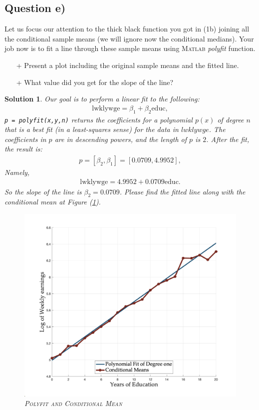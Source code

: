 \documentclass[9pt]{tufte-handout}
\newcommand{\inline}[1]{$ #1 $}
\newcommand{\problem}[1]{{\color{gray} #1}}
\newcommand{\solution}[1]{{\color{NavyBlue} #1}}
\newcommand{\qedblack}{\hfill \blacksquare}
\newtheorem*{Solution}{Solution}
\begin{document}
\subsection{Question e)}
\problem{Let us focus our attention to the thick black function you got in (1b) joining all the conditional sample means (we will ignore now the conditional medians). Your job now is to fit a line through these sample means using \textsc{Matlab} \textit{polyfit} function. 
	\begin{enumerate}
		\item [+] Present a plot including the original sample means and the fitted line.
		\item [+] What value did you get for the slope of the line?
	\end{enumerate}
}
\solution{\begin{Solution}
	\normalfont
	Our goal is to perform a linear fit to the following:
	\begin{align*}
		\text{lwklywge} = \beta_1 + \beta_2 \text{educ},
	\end{align*}
	\texttt{p = polyfit(x,y,n)} returns the coefficients for a polynomial $p(x)$ of degree $n$ that is a best fit (in a least-squares sense) for the data in $lwklywge$. The coefficients in $p$ are in descending powers, and the length of $p$ is $2$.
	After the fit, the result is:
	\begin{align*}
		p = [\beta_2, \beta_1] = [0.0709, 4.9952],
	\end{align*}
	Namely,
	\begin{align*}
		\text{lwklywge} = 4.9952+0.0709 \text{educ}.
	\end{align*}
	So the slope of the line is \inline{\beta_2 = 0.0709}.
	Please find the fitted line along with the conditional mean at Figure (\ref{fig:e}).
	\begin{figure}
		\includegraphics[scale = 0.18]{1e).png}
		\caption{\textsc{Polyfit and Conditional Mean}}
		\label{fig:e}
	\end{figure}
	\qedblack
	\end{Solution}
}
\end{document}
